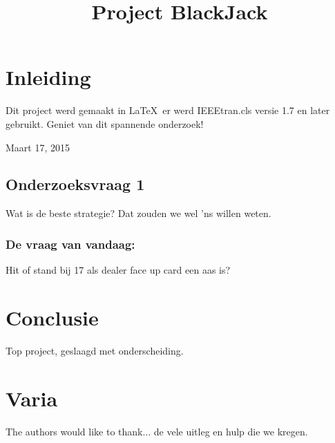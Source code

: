 \documentclass[conference]{IEEEtran}
\begin{document}
\title{Project BlackJack}
\author{
}
\maketitle
\begin{abstract}
\end{abstract}
\IEEEpeerreviewmaketitle

\section{Inleiding}
Dit project werd gemaakt in \LaTeX\ er werd
IEEEtran.cls versie 1.7 en later gebruikt.
Geniet van dit spannende onderzoek!
 
\hfill Maart 17, 2015

\subsection{Onderzoeksvraag 1}
Wat is de beste strategie? Dat zouden we wel 'ns willen weten.


\subsubsection{De vraag van vandaag:}
Hit of stand bij 17 als dealer face up card een aas is?

\section{Conclusie}
Top project, geslaagd met onderscheiding.

\section*{Varia}


The authors would like to thank... de vele uitleg en hulp die we kregen.

\end{document}
